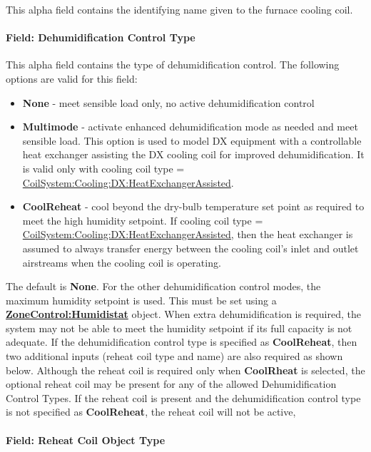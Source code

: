 This alpha field contains the identifying name given to the furnace cooling coil.

\paragraph{Field: Dehumidification Control Type}\label{field-dehumidification-control-type-1-000}

This alpha field contains the type of dehumidification control. The following options are valid for this field:

\begin{itemize}
\item
  \textbf{None} - meet sensible load only, no active dehumidification control
\item
  \textbf{Multimode} - activate enhanced dehumidification mode as needed and meet sensible load. This option is used to model DX equipment with a controllable heat exchanger assisting the DX cooling coil for improved dehumidification. It is valid only with cooling coil type = \hyperref[coilsystemcoolingdxheatexchangerassisted]{CoilSystem:Cooling:DX:HeatExchangerAssisted}.
\item
  \textbf{CoolReheat} - cool beyond the dry-bulb temperature set point as required to meet the high humidity setpoint. If cooling coil type = \hyperref[coilsystemcoolingdxheatexchangerassisted]{CoilSystem:Cooling:DX:HeatExchangerAssisted}, then the heat exchanger is assumed to always transfer energy between the cooling coil's inlet and outlet airstreams when the cooling coil is operating.
\end{itemize}

The default is \textbf{None}. For the other dehumidification control modes, the maximum humidity setpoint is used. This must be set using a \textbf{\hyperref[zonecontrolhumidistat]{ZoneControl:Humidistat}} object. When extra dehumidification is required, the system may not be able to meet the humidity setpoint if its full capacity is not adequate. If the dehumidification control type is specified as \textbf{CoolReheat}, then two additional inputs (reheat coil type and name) are also required as shown below. Although the reheat coil is required only when \textbf{CoolRheat} is selected, the optional reheat coil may be present for any of the allowed Dehumidification Control Types. If the reheat coil is present and the dehumidification control type is not specified as \textbf{CoolReheat}, the reheat coil will not be active,

\paragraph{Field: Reheat Coil Object Type}\label{field-reheat-coil-object-type-000}

